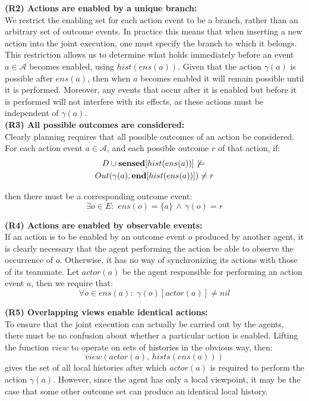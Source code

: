 \textbf{(R2) Actions are enabled by a unique branch:}\\
 We restrict the enabling set for each action event to be a branch,
rather than an arbitrary set of outcome events. In practice this means
that when inserting a new action into the joint execution, one must
specify the branch to which it belongs. This restriction allows us
to determine what holds immediately before an event $a\in\mathcal{A}$
becomes enabled, using $hist(ens(a))$. Given that the action $\gamma(a)$
is possible after $ens(a)$, then when $a$ becomes enabled it will
remain possible until it is performed. Moreover, any events that occur
after it is enabled but before it is performed will not interfere
with its effects, as these actions must be independent of $\gamma(a)$.
\\


\textbf{(R3) All possible outcomes are considered:}\\
 Clearly planning requires that all possible outcomes of an action
be considered. For each action event $a\in\mathcal{A}$, and each
possible outcome $r$ of that action, if:\begin{multline*}
D\cup\mathbf{sensed}[hist(ens(a))]\not\,\models\,\\
Out(\gamma(a),\mathbf{end}[hist(ens(a))])\neq r\end{multline*}


then there must be a corresponding outcome event:\[
\exists o\in E:\,\, ens(o)=\{a\}\,\wedge\,\gamma(o)=r\]


\textbf{(R4) Actions are enabled by observable events:}\\
 If an action is to be enabled by an outcome event $o$ produced by
another agent, it is clearly necessary that the agent performing the
action be able to observe the occurrence of $o$. Otherwise, it has
no way of synchronizing its actions with those of its teammate. Let
$actor(a)$ be the agent responsible for performing an action event
$a$, then we require that:\[
\forall o\in ens(a):\,\,\gamma(o)[actor(a)]\neq nil\]


\textbf{(R5) Overlapping views enable identical actions:}\\
 To ensure that the joint execution can actually be carried out by
the agents, there must be no confusion about whether a particular
action is enabled. Lifting the function $view$ to operate on sets
of histories in the obvious way, then:\[
view(actor(a),\, hists(ens(a)))\]
 gives the set of all local histories after which $actor(a)$ is required
to perform the action $\gamma(a)$. However, since the agent has only
a local viewpoint, it may be the case that some other outcome set
can produce an identical local history.

